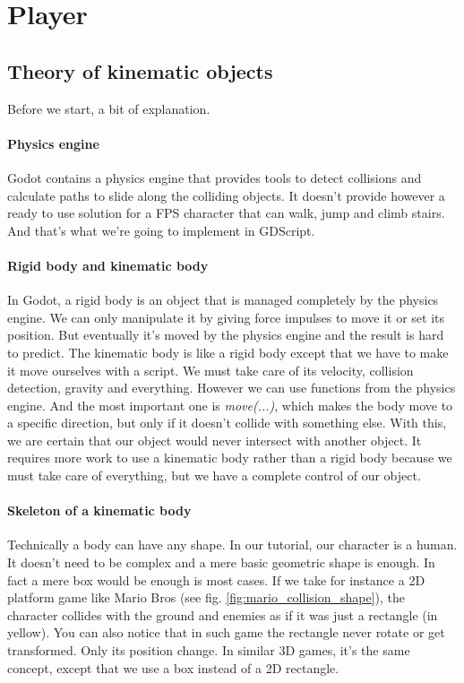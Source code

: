 \documentclass[10pt,a4paper]{article}
\begin{document}
\section{Player}

\subsection{Theory of kinematic objects}
Before we start, a bit of explanation.

\paragraph{Physics engine} Godot contains a physics engine that provides tools to detect collisions and calculate paths to slide along the colliding objects. It doesn't provide however a ready to use solution for a FPS character that can walk, jump and climb stairs. And that's what we're going to implement in GDScript.

\paragraph{Rigid body and kinematic body}
In Godot, a rigid body is an object that is managed completely by the physics engine. We can only manipulate it by giving force impulses to move it or set its position. But eventually it's moved by the physics engine and the result is hard to predict. The kinematic body is like a rigid body except that we have to make it move ourselves with a script. We must take care of its velocity, collision detection, gravity and everything. However we can use functions from the physics engine. And the most important one is \textit{move(...)}, which makes the body move to a specific direction, but only if it doesn't collide with something else. With this, we are certain that our object would never intersect with another object. It requires more work to use a kinematic body rather than a rigid body because we must take care of everything, but we have a complete control of our object.

\paragraph{Skeleton of a kinematic body} Technically a body can have any shape. In our tutorial, our character is a human. It doesn't need to be complex and a mere basic geometric shape is enough. In fact a mere box would be enough is most cases. If we take for instance a 2D platform game like Mario Bros (see fig. \ref{fig:mario_collision_shape}), the character collides with the ground and enemies as if it was just a rectangle (in yellow). You can also notice that in such game the rectangle never rotate or get transformed. Only its position change. In similar 3D games, it's the same concept, except that we use a box instead of a 2D rectangle. 
\end{document}
